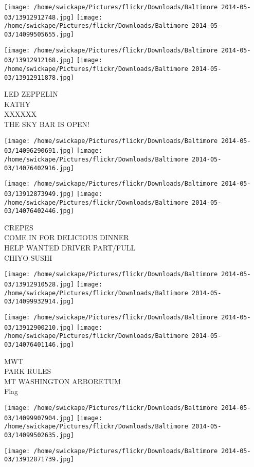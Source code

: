 \documentclass[10pt,letterpaper]{article}
\begin{document}
\texttt{[image: /home/swickape/Pictures/flickr/Downloads/Baltimore 2014-05-03/13912912748.jpg]}
\texttt{[image: /home/swickape/Pictures/flickr/Downloads/Baltimore 2014-05-03/14099505655.jpg]}

\texttt{[image: /home/swickape/Pictures/flickr/Downloads/Baltimore 2014-05-03/13912912168.jpg]}
\texttt{[image: /home/swickape/Pictures/flickr/Downloads/Baltimore 2014-05-03/13912911878.jpg]}

LED ZEPPELIN\\
KATHY\\
XXXXXX\\
THE SKY BAR IS OPEN!
\pagebreak

\texttt{[image: /home/swickape/Pictures/flickr/Downloads/Baltimore 2014-05-03/14096290691.jpg]}
\texttt{[image: /home/swickape/Pictures/flickr/Downloads/Baltimore 2014-05-03/14076402916.jpg]}

\texttt{[image: /home/swickape/Pictures/flickr/Downloads/Baltimore 2014-05-03/13912873949.jpg]}
\texttt{[image: /home/swickape/Pictures/flickr/Downloads/Baltimore 2014-05-03/14076402446.jpg]}

CREPES\\
COME IN FOR DELICIOUS DINNER\\
HELP WANTED DRIVER PART/FULL\\
CHIYO SUSHI
\pagebreak

\texttt{[image: /home/swickape/Pictures/flickr/Downloads/Baltimore 2014-05-03/13912910528.jpg]}
\texttt{[image: /home/swickape/Pictures/flickr/Downloads/Baltimore 2014-05-03/14099932914.jpg]}

\texttt{[image: /home/swickape/Pictures/flickr/Downloads/Baltimore 2014-05-03/13912900210.jpg]}
\texttt{[image: /home/swickape/Pictures/flickr/Downloads/Baltimore 2014-05-03/14076401146.jpg]}

MWT\\
PARK RULES\\
MT WASHINGTON ARBORETUM\\
Flag
\pagebreak

\texttt{[image: /home/swickape/Pictures/flickr/Downloads/Baltimore 2014-05-03/14099907904.jpg]}
\texttt{[image: /home/swickape/Pictures/flickr/Downloads/Baltimore 2014-05-03/14099502635.jpg]}

\texttt{[image: /home/swickape/Pictures/flickr/Downloads/Baltimore 2014-05-03/13912871739.jpg]}
\end{document}
